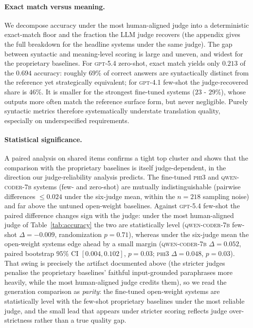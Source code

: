 \paragraph{Exact match versus meaning.}
We decompose accuracy under the most human-aligned judge into a deterministic exact-match floor and the fraction the LLM judge recovers (the appendix gives the full breakdown for the headline systems under the same judge). The gap between syntactic and meaning-level scoring is large and uneven, and widest for the proprietary baselines. For \textsc{gpt-5.4} zero-shot, exact match yields only $0.213$ of the $0.694$ accuracy: roughly $69\%$ of correct answers are syntactically distinct from the reference yet strategically equivalent; for \textsc{gpt-4.1} few-shot the judge-recovered share is $46\%$. It is smaller for the strongest fine-tuned systems ($23$ - $29\%$), whose outputs more often match the reference surface form, but never negligible. Purely syntactic metrics therefore systematically understate translation quality, especially on underspecified requirements.

\paragraph{Statistical significance.}
A paired analysis on shared items confirms a tight top cluster and shows that the comparison with the proprietary baselines is itself judge-dependent, in the direction our judge-reliability analysis predicts. The fine-tuned \textsc{phi3} and \textsc{qwen-coder-7b} systems (few- and zero-shot) are mutually indistinguishable (pairwise differences $\le 0.024$ under the six-judge mean, within the $n{=}218$ sampling noise) and far above the untuned open-weight baselines. Against \textsc{gpt-5.4} few-shot the paired difference changes sign with the judge: under the most human-aligned judge of Table~\ref{tab:accuracy} the two are statistically level (\textsc{qwen-coder-7b} few-shot $\Delta=-0.009$, randomization $p=0.71$), whereas under the six-judge mean the open-weight systems edge ahead by a small margin (\textsc{qwen-coder-7b} $\Delta=0.052$, paired bootstrap $95\%$ CI $[0.004,0.102]$, $p=0.03$; \textsc{phi3} $\Delta=0.048$, $p=0.03$). That swing is precisely the artifact documented above (the stricter judges penalise the proprietary baselines' faithful input-grounded paraphrases more heavily, while the most human-aligned judge credits them), so we read the generation comparison as \emph{parity}: the fine-tuned open-weight systems are statistically level with the few-shot proprietary baselines under the most reliable judge, and the small lead that appears under stricter scoring reflects judge over-strictness rather than a true quality gap.

